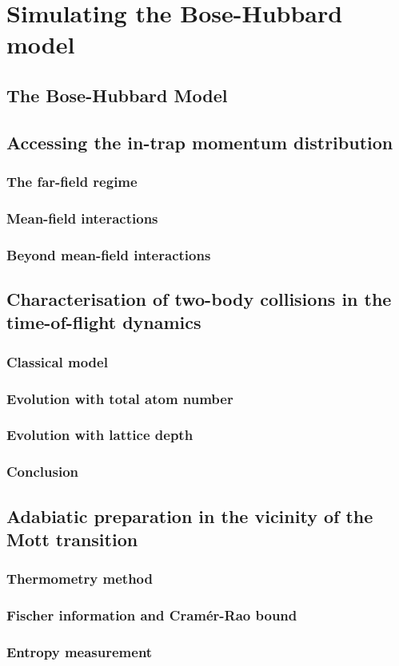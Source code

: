 \chapter{Simulating the Bose-Hubbard model}

\section{The Bose-Hubbard Model}

\section{Accessing the in-trap momentum distribution}

\subsection{The far-field regime}

\subsection{Mean-field interactions}

\subsection{Beyond mean-field interactions}

\section{Characterisation of two-body collisions in the time-of-flight dynamics}

\subsection{Classical model}

\subsection{Evolution with total atom number}

\subsection{Evolution with lattice depth}

\subsection{Conclusion}

\section{Adabiatic preparation in the vicinity of the Mott transition}

\subsection{Thermometry method}

\subsection{Fischer information and Cramér-Rao bound}

\subsection{Entropy measurement}